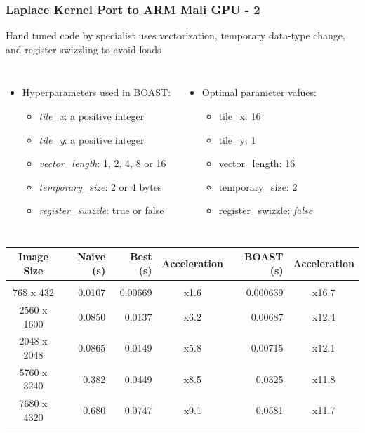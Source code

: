 \documentclass{beamer}
\begin{document}
\begin{frame}
  \frametitle{Laplace Kernel Port to ARM Mali GPU - 2}
  Hand tuned code by specialist uses vectorization, temporary data-type change, and register swizzling to avoid loads
  \begin{columns}
  \begin{itemize}
    \item Hyperparameters used in BOAST:
    \begin{itemize}
      \item \emph{tile\_x}: a positive integer
      \item \emph{tile\_y}: a positive integer
      \item \emph{vector\_length}: 1, 2, 4, 8 or 16
      \item \emph{temporary\_size}: 2 or 4 bytes
      \item \emph{register\_swizzle}: true or false
    \end{itemize}
  \end{itemize}
  \begin{itemize}
    \item Optimal parameter values:
    \begin{itemize}
      \item tile\_x: 16
      \item tile\_y: 1
      \item vector\_length: 16
      \item temporary\_size: 2
      \item register\_swizzle: \emph{false}
    \end{itemize}
  \end{itemize}
  \end{columns}

  \begin{center}
  \scriptsize
  \begin{tabular}{c|r|r|c|r|c}
    Image Size  & Naive (s) & Best (s) & Acceleration & BOAST (s) & Acceleration \\
    \hline&&&&\\
  768 x 432   & 0.0107    & 0.00669  & x1.6         & 0.000639  & x16.7 \\
  2560 x 1600 & 0.0850    & 0.0137   & x6.2         & 0.00687   & x12.4 \\
  2048 x 2048 & 0.0865    & 0.0149   & x5.8         & 0.00715   & x12.1 \\
  5760 x 3240 & 0.382     & 0.0449   & x8.5         & 0.0325    & x11.8 \\
  7680 x 4320 & 0.680     & 0.0747   & x9.1         & 0.0581    & x11.7
  \end{tabular}
  \end{center}

\end{frame}
\end{document}
